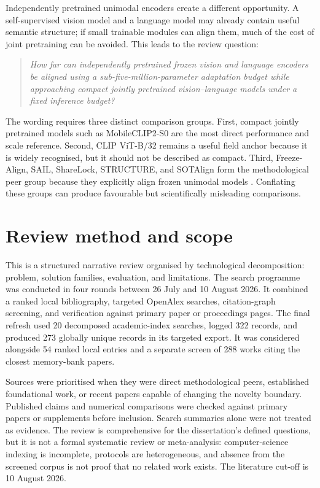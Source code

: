 \documentclass[11pt,a4paper]{article}
\begin{document}
Independently pretrained unimodal encoders create a different opportunity. A
self-supervised vision model and a language model may already contain useful
semantic structure; if small trainable modules can align them, much of the cost
of joint pretraining can be avoided. This leads to the review question:

\begin{quote}
\emph{How far can independently pretrained frozen vision and language encoders
be aligned using a sub-five-million-parameter adaptation budget while
approaching compact jointly pretrained vision--language models under a fixed
inference budget?}
\end{quote}

The wording requires three distinct comparison groups. First, compact jointly
pretrained models such as MobileCLIP2-S0 are the most direct performance and
scale reference. Second, CLIP ViT-B/32 remains a useful field anchor because it
is widely recognised, but it should not be described as compact. Third,
Freeze-Align, SAIL, ShareLock, STRUCTURE, and SOTAlign form the methodological
peer group because they explicitly align frozen unimodal models
\cite{maniparambil2025freezealign,zhang2025sail,ruthardt2026sharelock,groger2025structure,roschmann2026sotalign}.
Conflating these groups can produce favourable but scientifically misleading
comparisons.

\section{Review method and scope}

This is a structured narrative review organised by technological decomposition:
problem, solution families, evaluation, and limitations. The search programme
was conducted in four rounds between 26 July and 10 August 2026. It combined a
ranked local bibliography, targeted OpenAlex searches, citation-graph screening,
and verification against primary paper or proceedings pages. The final refresh
used 20 decomposed academic-index searches, logged 322 records, and produced 273
globally unique records in its targeted export. It was considered alongside 54
ranked local entries and a separate screen of 288 works citing the closest
memory-bank papers.

Sources were prioritised when they were direct methodological peers, established
foundational work, or recent papers capable of changing the novelty boundary.
Published claims and numerical comparisons were checked against primary papers
or supplements before inclusion. Search summaries alone were not treated as
evidence. The review is comprehensive for the dissertation's defined questions,
but it is not a formal systematic review or meta-analysis: computer-science
indexing is incomplete, protocols are heterogeneous, and absence from the
screened corpus is not proof that no related work exists. The literature cut-off
is 10 August 2026.
\end{document}
